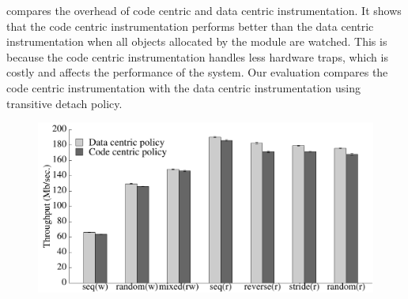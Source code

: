  compares the overhead of code centric and data centric instrumentation. It shows that the code centric instrumentation performs better than the data centric instrumentation when all objects allocated by the module are watched. This is because the code centric instrumentation handles less hardware traps, which is costly and affects the performance of the system. Our evaluation compares the code centric instrumentation with the data centric instrumentation using transitive detach policy.


\begin{figure}[!h]
\begin{center}
\includegraphics[width=6.0in]{thesis_watch_inode_compare.pdf}
\end{center}


\end{figure}
